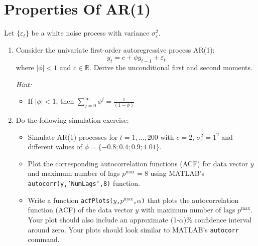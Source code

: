 \section[Properties of AR(1)]{Properties Of AR(1)\label{ex:PropertiesAR1}}

Let \( \{\varepsilon_t\} \) be a white noise process with variance \(\sigma_\varepsilon^2\).

\begin{enumerate}
\item Consider the univariate first-order autoregressive process AR(1): 
\[y_t = c + \phi y_{t-1} + \varepsilon_{t}\]
where \(|\phi|<1\) and \(c\in \mathbb{R}\).
Derive the unconditional first and second moments.

\emph{Hint:}
\begin{itemize}
	\item If \(|\phi|<1\), then \(\sum_{j=0}^{\infty} \phi^j = \frac{1}{(1-\phi)}\)
\end{itemize}

\item Do the following simulation exercise:
\begin{itemize}
	\item Simulate AR(1) processes for \(t=1,\ldots,200\) with \(c=2\), \(\sigma_\varepsilon^2 = 1^2\) and different values of \( \phi=\{-0.8;0.4;0.9;1.01\} \).
	\item Plot the corresponding autocorrelation functions (ACF) for data vector $y$ and maximum number of lags \(p^{\text{max}}=8\) using MATLAB's \texttt{autocorr(y,'NumLags',8)} function.
	\item Write a function \texttt{acfPlots(\(y\),\(p^{\text{max}}\),\( \alpha \))} that plots the autocorrelation function (ACF) of the data vector \(y\) with maximum number of lags \(p^{\text{max}}\).
	Your plot should also include an approximate (1-\( \alpha \))\% confidence interval around zero.
	Your plots should look similar to MATLAB's \texttt{autocorr} command.
\end{itemize}
	

\end{enumerate}
